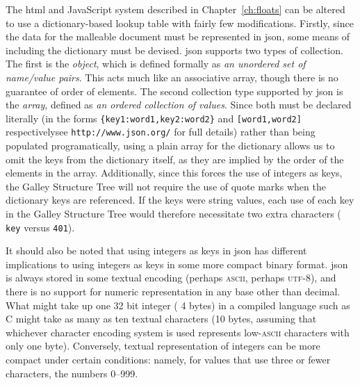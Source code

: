 The \gls{html} and JavaScript system described in Chapter~\ref{ch:floats} can be altered to use a dictionary-based lookup table with fairly few modifications. Firstly, since the data for the malleable document must be represented in \gls{json}, some means of including the dictionary must be devised. \gls{json} supports two types of collection. The first is the \emph{object}, which is defined formally as \emph{an \mbox{unordered} set of name/value pairs}. This acts much like an associative array, though there is no guarantee of order of elements.  The second collection type supported by \gls{json} is the \emph{array}, defined as \emph{an ordered collection of values}. Since both must be declared literally (in the forms \texttt{\{\textquotedbl key1\textquotedbl:\textquotedbl word1\textquotedbl,\textquotedbl key2\textquotedbl:\textquotedbl word2\textquotedbl\}} and \texttt{[\textquotedbl word1\textquotedbl,\textquotedbl word2\textquotedbl]} respectively\ed see \texttt{http://www.json.org/} for full details) rather than being populated programatically, using a plain array for the dictionary allows us to omit the keys from the dictionary itself, as they are implied by the order of the elements in the array. Additionally, since this forces the use of integers as keys, the Galley Structure Tree will not require the use of quote marks when the dictionary keys are referenced. If the keys were string values, each use of each key in the Galley Structure Tree would therefore necessitate two extra characters (\eg{} \texttt{\textquotedbl key\textquotedbl} versus \texttt{401}).

It should also be noted that using integers as keys in \gls{json} has different implications to using integers as keys in some more compact binary format. \gls{json} is always stored in some textual encoding (perhaps \textsc{ascii}, perhaps \textsc{utf-8}), and there is no support for numeric representation in any base other than decimal. What might take up one 32 bit integer (\ie{} 4 bytes) in a compiled language such as C might take as many as ten textual characters (10 bytes, assuming that whichever character encoding system is used represents low-\textsc{ascii} characters with only one byte). Conversely, textual representation of integers can be more compact under certain conditions: namely, for values that use three or fewer characters, \ie{} the numbers 0--999.

